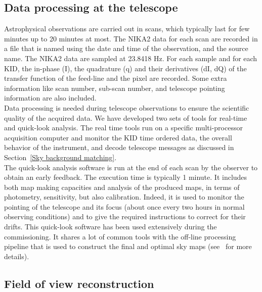 \documentclass[]{aa} %
\begin{document}
\subsection{Data processing at the telescope}
\label{Data processing at the telescope}

Astrophysical observations are carried out in scans, which typically last for few minutes up to 20 minutes at most.
The NIKA2 data for each scan are recorded in a file that is named using the date and time of the observation, and
the source name. The NIKA2 data are sampled at 23.8418 Hz. For each sample and for each KID, the in-phase (I), the quadrature
(q) and their derivatives (dI, dQ) of the transfer function of the feed-line and the pixel are recorded.
Some extra information like scan number, sub-scan number, and telescope pointing information are also included. \\

Data processing is needed during telescope observations to ensure the scientific quality of the acquired data.
We have developed two sets of tools for real-time and quick-look analysis. The real time tools run on a specific multi-processor acquisition computer and monitor the KID time ordered data, the overall behavior of the instrument, and decode telescope messages as discussed in Section~\ref{Sky background matching}. \\

The quick-look analysis software is run at the end of each scan by the observer to obtain an early feedback. The execution time is typically 1 minute. It includes both map making capacities and analysis of the produced maps, in terms of photometry, sensitivity, but also calibration. Indeed, it is used to monitor the pointing of the telescope and its focus (about once every two hours in normal observing conditions) and to give the required instructions to correct for their drifts. This quick-look software has been used extensively during the commissioning. It shares a lot of common tools with the off-line processing pipeline that is used to construct the final and optimal sky maps (see~\cite{ponthieu} for more details).

\subsection{Field of view reconstruction}
\end{document}
